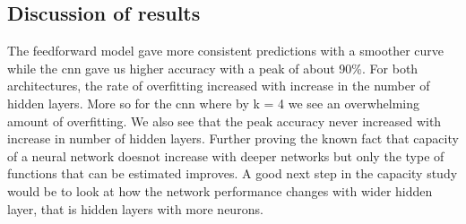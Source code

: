 \documentclass[titlepage]{article}
\begin{document}
\subsection{Discussion of results}
\par The feedforward model gave more consistent predictions with a smoother curve while the cnn gave us higher accuracy with a peak of about 90\%. For both architectures, the rate of overfitting increased with increase in the number of hidden layers. More so for the cnn where by k = 4 we see an overwhelming amount of overfitting. We also see that the peak accuracy never increased with increase in number of hidden layers. Further proving the known fact that capacity of a neural network doesnot increase with deeper networks but only the type of functions that can be estimated improves. A good next step in the capacity study would be to look at how the network performance changes with wider hidden layer, that is hidden layers with more neurons.




\end{document}
